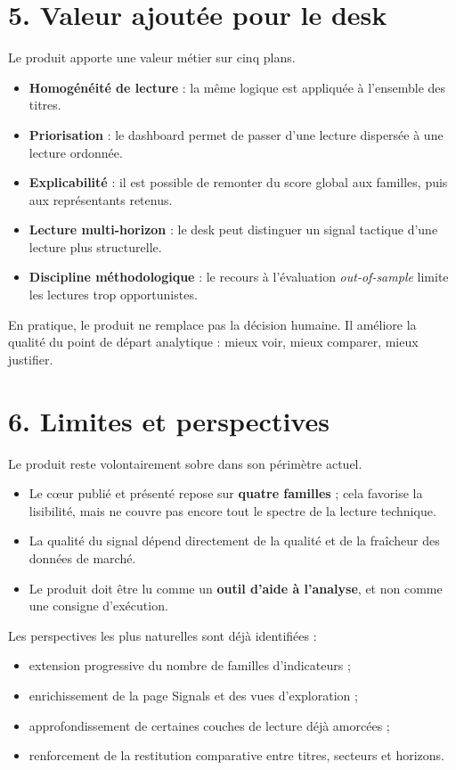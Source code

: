\documentclass[11pt,a4paper]{article}
\begin{document}
\section*{5. Valeur ajoutée pour le desk}

Le produit apporte une valeur métier sur cinq plans.

\begin{itemize}
\item \textbf{Homogénéité de lecture} : la même logique est appliquée à l'ensemble des titres.
\item \textbf{Priorisation} : le dashboard permet de passer d'une lecture dispersée à une lecture ordonnée.
\item \textbf{Explicabilité} : il est possible de remonter du score global aux familles, puis aux représentants retenus.
\item \textbf{Lecture multi-horizon} : le desk peut distinguer un signal tactique d'une lecture plus structurelle.
\item \textbf{Discipline méthodologique} : le recours à l'évaluation \textit{out-of-sample} limite les lectures trop opportunistes.
\end{itemize}

En pratique, le produit ne remplace pas la décision humaine. Il améliore la qualité du point de départ analytique : mieux voir, mieux comparer, mieux justifier.

\section*{6. Limites et perspectives}

Le produit reste volontairement sobre dans son périmètre actuel.

\begin{itemize}
\item Le cœur publié et présenté repose sur \textbf{quatre familles} ; cela favorise la lisibilité, mais ne couvre pas encore tout le spectre de la lecture technique.
\item La qualité du signal dépend directement de la qualité et de la fraîcheur des données de marché.
\item Le produit doit être lu comme un \textbf{outil d'aide à l'analyse}, et non comme une consigne d'exécution.
\end{itemize}

Les perspectives les plus naturelles sont déjà identifiées :

\begin{itemize}
\item extension progressive du nombre de familles d'indicateurs ;
\item enrichissement de la page Signals et des vues d'exploration ;
\item approfondissement de certaines couches de lecture déjà amorcées ;
\item renforcement de la restitution comparative entre titres, secteurs et horizons.
\end{itemize}
\end{document}
